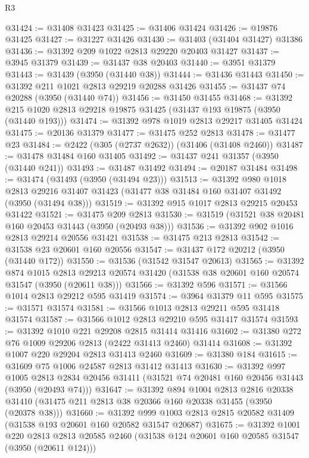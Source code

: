 \begin{lexlean}{R3}
\begin{coremodule}
@31424 := @31408 @31423
@31425 := @31406 @31424
@31426 := @19876 @31425
@31427 := @31227 @31426
@31430 := @31403 (@31404 @31427) @31386
@31436 := @31392 @209 @1022 @2813 @29220 @20403 @31427
@31437 := @3945 @31379
@31439 := @31437 @38 @20403
@31440 := @3951 @31379
@31443 := @31439 (@3950 (@31440 @38))
@31444 := @31436 @31443
@31450 := @31392 @211 @1021 @2813 @29219 @20288 @31426
@31455 := @31437 @74 @20288 (@3950 (@31440 @74))
@31456 := @31450 @31455
@31468 := @31392 @215 @1020 @2813 @29218 @19875 @31425 (@31437 @193 @19875 (@3950 (@31440 @193)))
@31474 := @31392 @978 @1019 @2813 @29217 @31405 @31424
@31475 := @20136 @31379
@31477 := @31475 @252 @2813
@31478 := @31477 @23
@31484 := @2422 (@305 (@2737 @2632)) (@31406 (@31408 @2460))
@31487 := @31478 @31484 @160 @31405
@31492 := @31437 @241 @31357 (@3950 (@31440 @241))
@31493 := @31487 @31492
@31494 := @20187 @31484
@31498 := @31474 (@31493 (@3950 (@31494 @23)))
@31513 := @31392
    @980
    @1018
    @2813
    @29216
    @31407
    @31423
    (@31477 @38 @31484 @160 @31407 @31492 (@3950 (@31494 @38)))
@31519 := @31392 @915 @1017 @2813 @29215 @20453 @31422
@31521 := @31475 @209 @2813
@31530 := @31519 (@31521 @38 @20481 @160 @20453 @31443 (@3950 (@20493 @38)))
@31536 := @31392 @902 @1016 @2813 @29214 @20556 @31421
@31538 := @31475 @213 @2813
@31542 := @31538 @23 @20601 @160 @20556
@31547 := @31437 @172 @20212 (@3950 (@31440 @172))
@31550 := @31536 (@31542 @31547 @20613)
@31565 := @31392
    @874
    @1015
    @2813
    @29213
    @20574
    @31420
    (@31538 @38 @20601 @160 @20574 @31547 (@3950 (@20611 @38)))
@31566 := @31392 @596
@31571 := @31566 @1014 @2813 @29212 @595 @31419
@31574 := @3964 @31379 @11 @595
@31575 := @31571 @31574
@31581 := @31566 @1013 @2813 @29211 @595 @31418 @31574
@31587 := @31566 @1012 @2813 @29210 @595 @31417 @31574
@31593 := @31392 @1010 @221 @29208 @2815 @31414 @31416
@31602 := @31380 @272 @76 @1009 @29206 @2813 (@2422 @31413 @2460) @31414
@31608 := @31392 @1007 @220 @29204 @2813 @31413 @2460
@31609 := @31380 @184
@31615 := @31609 @75 @1006 @24587 @2813 @31412 @31413
@31630 := @31392
    @997
    @1005
    @2813
    @2834
    @20456
    @31411
    (@31521 @74 @20481 @160 @20456 @31443 (@3950 (@20493 @74)))
@31647 := @31392
    @894
    @1004
    @2813
    @2816
    @20338
    @31410
    (@31475 @211 @2813 @38 @20366 @160 @20338 @31455 (@3950 (@20378 @38)))
@31660 := @31392 @999 @1003 @2813 @2815 @20582 @31409 (@31538 @193 @20601 @160 @20582 @31547 @20687)
@31675 := @31392
    @1001
    @220
    @2813
    @2813
    @20585
    @2460
    (@31538 @124 @20601 @160 @20585 @31547 (@3950 (@20611 @124)))

\end{coremodule}
\end{lexlean}
